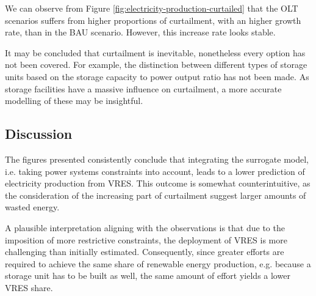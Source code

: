 We can observe from Figure \ref{fig:electricity-production-curtailed} that the OLT scenarios suffers from higher proportions of curtailment, with an higher growth rate, than in the BAU scenario. However, this increase rate looks stable.

It may be concluded that curtailment is inevitable, nonetheless every option has not been covered. For example, the distinction between different types of storage units based on the storage capacity to power output ratio has not been made. As storage facilities have a massive influence on curtailment, a more accurate modelling of these may be insightful.

\subsection{Discussion}

The figures presented consistently conclude that integrating the surrogate model, i.e. taking power systems constraints into account, leads to a lower prediction of electricity production from VRES. This outcome is somewhat counterintuitive, as the consideration of the increasing part of curtailment suggest larger amounts of wasted energy.

A plausible interpretation aligning with the observations is that due to the imposition of more restrictive constraints, the deployment of VRES is more challenging than initially estimated. Consequently, since greater efforts are required to achieve the same share of renewable energy production, e.g. because a storage unit has to be built as well, the same amount of effort yields a lower VRES share.


